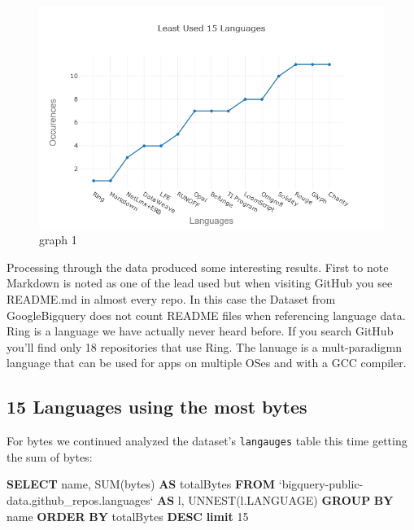\documentclass[11pt]{article}
\makeatletter
\def\maxwidth{\ifdim\Gin@nat@width>\linewidth\linewidth
    \else\Gin@nat@width\fi}
\let\Oldincludegraphics\includegraphics
\renewcommand{\includegraphics}[1]{\Oldincludegraphics[width=.8\maxwidth]{#1}}
\newenvironment{Shaded}{}{}
\newcommand{\KeywordTok}[1]{\textcolor[rgb]{0.00,0.44,0.13}{\textbf{{#1}}}}
\newcommand{\DecValTok}[1]{\textcolor[rgb]{0.25,0.63,0.44}{{#1}}}
\newcommand{\FunctionTok}[1]{\textcolor[rgb]{0.02,0.16,0.49}{{#1}}}
\newcommand{\NormalTok}[1]{{#1}}
\makeatother
\begin{document}
    \begin{figure}
\centering
\includegraphics{newplot2.png}
\caption{graph 1}
\end{figure}

    Processing through the data produced some interesting results. First to
note Markdown is noted as one of the lead used but when visiting GitHub
you see README.md in almost every repo. In this case the Dataset from
GoogleBigquery does not count README files when referencing language
data. Ring is a language we have actually never heard before. If you
search GitHub you'll find only 18 repositories that use Ring. The
lanuage is a mult-paradigmn language that can be used for apps on
multiple OSes and with a GCC compiler.

    \hypertarget{languages-using-the-most-bytes}{%
\subsection{15 Languages using the most
bytes}\label{languages-using-the-most-bytes}}

    For bytes we continued analyzed the dataset's \texttt{langauges} table
this time getting the sum of bytes:

\begin{Shaded}
\begin{Highlighting}[]
\KeywordTok{SELECT}
\NormalTok{  name,}
  \FunctionTok{SUM}\NormalTok{(bytes) }\KeywordTok{AS}\NormalTok{ totalBytes}
\KeywordTok{FROM}
\NormalTok{  `bigquery-public-data.github_repos.languages` }\KeywordTok{AS}\NormalTok{ l,}
\NormalTok{  UNNEST(l.LANGUAGE)}
\KeywordTok{GROUP} \KeywordTok{BY}
\NormalTok{  name}
\KeywordTok{ORDER} \KeywordTok{BY}
\NormalTok{  totalBytes }\KeywordTok{DESC}
\KeywordTok{limit} \DecValTok{15}
\end{Highlighting}
\end{Shaded}
\end{document}
